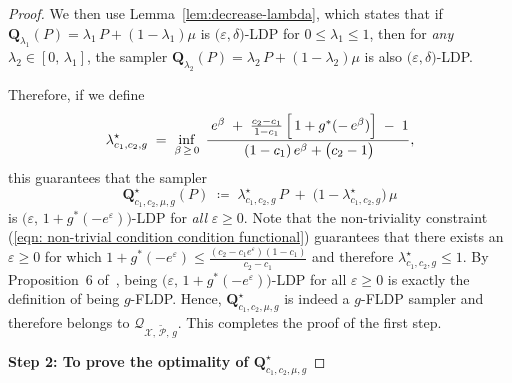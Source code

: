 \documentclass[accepted]{article}
\theoremstyle{plain} %
\theoremstyle{definition}
\theoremstyle{remark}
\newcommand{\eps}{\varepsilon}
\newcommand{\bQ}{\mathbf{Q}}
\begin{document}
\begin{proof}
We then use Lemma~\ref{lem:decrease-lambda}, which states that if $\bQ_{\lambda_1}(P) = \lambda_1\,P + (1 - \lambda_1)\mu$ is $\bigl(\varepsilon,\delta\bigr)$-LDP for $0 \leq \lambda_1 \leq 1$, then for \emph{any} $\lambda_2 \in [0,\,\lambda_1]$, the sampler $\bQ_{\lambda_2}(P) = \lambda_2\,P + (1 - \lambda_2)\mu$ is also $\bigl(\varepsilon,\delta\bigr)$-LDP.  

Therefore, if we define 
\[
\lambda^\star_{{c_1,c_2,g}} 
\;=\;
\inf_{\beta \,\ge\, 0}\;
\frac{\;e^{\beta } \;+\; \tfrac{c_2 - c_1}{\,1 - c_1\,}\,\Bigl[\,1 + g^*(-\,e^\beta )\Bigr] \;-\; 1}
     {\,(1 - c_1)\,e^\beta  + \bigl(c_2 - 1\bigr)},
\]
this guarantees that the sampler
\[
\bQ^\star_{{c_1,c_2,\mu,g}}(P) 
\;\coloneqq\; 
\lambda^\star_{c_1,c_2,g}\,P \;+\; \bigl(1 - \lambda^\star_{c_1,c_2,g}\bigr)\,\mu
\]
is $\bigl(\varepsilon,\,1 + g^*(-e^\varepsilon)\bigr)$-LDP for \emph{all} $\varepsilon \ge 0$. Note that the non-triviality constraint (\ref{eqn: non-trivial condition condition functional}) guarantees that there exists an $\eps \geq 0$ for which $1 + g^*(-e^\eps) \leq \frac{(c_2-c_1e^\eps)(1-c_1)}{c_2-c_1}$ and therefore $\lambda^\star_{c_1,c_2,g} \leq 1$. By Proposition~6 of~\citet{dong2022gaussian}, being $\bigl(\varepsilon,\,1 + g^*(-e^\varepsilon)\bigr)$-LDP for all $\varepsilon \ge 0$ is exactly the definition of being $g$-FLDP. 
Hence, $\bQ^\star_{c_1,c_2,\mu,g}$ is indeed a $g$-FLDP sampler and therefore belongs to $\mathcal{Q}_{\mathcal{X},\,\tilde{\mathcal{P}},\,g}$.  This completes the proof of the first step.


           \textbf{Step 2: To prove the optimality of $\bQ^\star_{c_1,c_2,\mu,g}$ } 


\end{proof}
\end{document}
